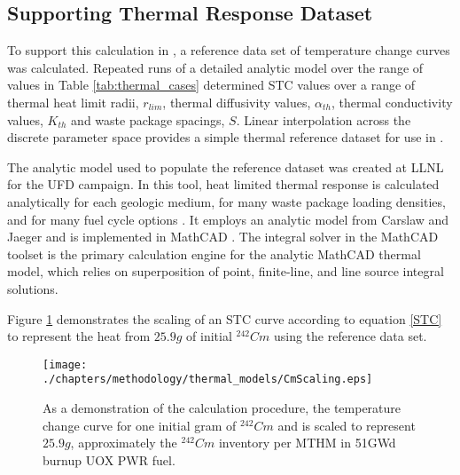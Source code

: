 \subsection{Supporting Thermal Response Dataset}
To support this calculation in \Cyder, a reference data set of temperature change 
curves was calculated. Repeated runs of a detailed analytic model over the range of values in Table 
\ref{tab:thermal_cases} determined \gls{STC} values over a range of thermal 
heat limit radii, $r_{lim}$, thermal diffusivity values, $\alpha_{th}$,
thermal conductivity values, $K_{th}$ and waste package spacings, $S$. Linear 
interpolation across the discrete parameter space provides a simple thermal 
reference dataset for use in \Cyder.



The analytic model used to populate the reference dataset was created at 
\gls{LLNL} for the \gls{UFD} campaign. In this tool, heat limited thermal 
response is calculated analytically for each geologic medium, for many waste package 
loading densities, and for many fuel cycle options \cite{hardin_generic_2011, 
greenberg_investigations_2012, greenberg_application_2012}. It employs an 
analytic model from Carslaw and Jaeger and is implemented in MathCAD 
\cite{carslaw_conduction_1959, ptc_mathcad_2010}.  The integral solver in the 
MathCAD toolset is the primary calculation engine for the analytic MathCAD 
thermal model, which relies on superposition of point, finite-line, and line 
source integral solutions.  

%

Figure \ref{fig:CmScaling} demonstrates the scaling of an STC curve according to 
equation \eqref{STC} to represent the heat from $25.9g$ of initial $^{242}Cm$ using 
the reference data set. 

\begin{figure}[h!]
\begin{center}
\texttt{[image: ./chapters/methodology/thermal\_models/CmScaling.eps]}
\end{center}
\caption{As a demonstration of the calculation procedure, the temperature change 
  curve for one initial gram of $^{242}Cm$ and is scaled to represent $25.9g$, 
  approximately the $^{242}Cm$ inventory per MTHM in 51GWd burnup UOX PWR fuel. }
\label{fig:CmScaling}
\end{figure}


